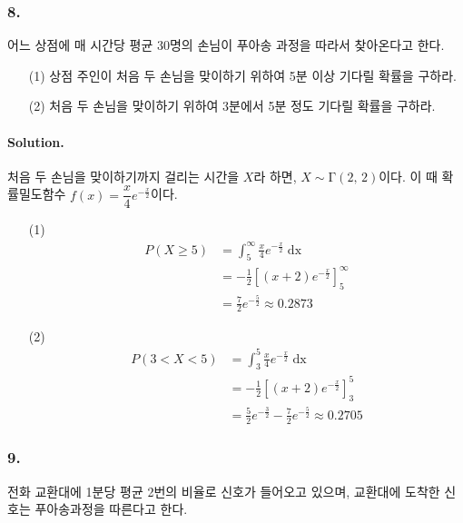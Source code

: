 \subsubsection{8.} 어느 상점에 매 시간당 평균 30명의 손님이 푸아송 과정을 따라서 찾아온다고 한다.

\begin{itemize}
	\item [(1)] 상점 주인이 처음 두 손님을 맞이하기 위하여 5분 이상 기다릴 확률을 구하라.
	\item [(2)] 처음 두 손님을 맞이하기 위하여 3분에서 5분 정도 기다릴 확률을 구하라.
\end{itemize}

\paragraph{Solution.} 처음 두 손님을 맞이하기까지 걸리는 시간을 $X$라 하면, $X \sim \mathrm{\Gamma}\left(2,\,2\right)$이다.
이 때 확률밀도함수 $f\left(x\right) = \dfrac{x}{4} e^{-\frac{x}{2}}$이다.

\begin{itemize}
	\item [(1)] {
		\begin{align*}
			P\left(X \geq 5\right) &= \int_5^\infty \frac{x}{4} e^{-\frac{x}{2}} \mathop{dx} \\
			&= -\frac{1}{2} \left[\left(x+2\right)e^{-\frac{x}{2}}\right]_5^\infty \\
			&= \frac{7}{2} e^{-\frac{5}{2}} \approx 0.2873
		\end{align*}
	}
	\item [(2)] {
		\begin{align*}
			P\left(3 < X < 5\right) &= \int_3^5 \frac{x}{4} e^{-\frac{x}{2}} \mathop{dx} \\
			&= -\frac{1}{2} \left[\left(x+2\right)e^{-\frac{x}{2}}\right]_3^5 \\
			&= \frac{5}{2} e^{-\frac{3}{2}} - \frac{7}{2} e^{-\frac{5}{2}} \approx 0.2705
		\end{align*}
	}
\end{itemize}

\subsubsection{9.} 전화 교환대에 1분당 평균 2번의 비율로 신호가 들어오고 있으며, 교환대에 도착한 신호는 푸아송과정을 따른다고 한다.

